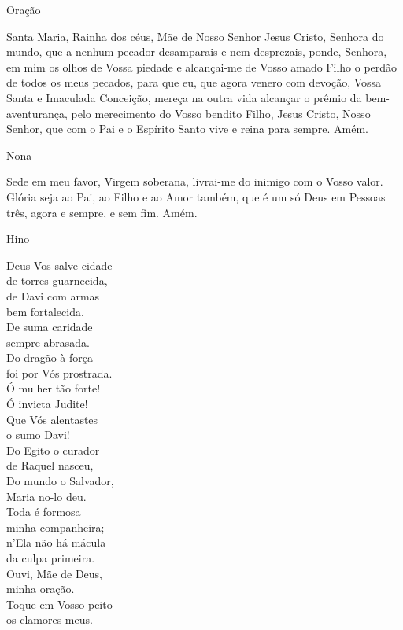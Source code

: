 \begin{center}
    \textcolor{VioletRed3}{Oração}
\end{center}
\begin{flushleft}
    Santa Maria, Rainha dos céus, Mãe de Nosso Senhor Jesus Cristo, Senhora do mundo, que a nenhum pecador desamparais e nem desprezais, ponde, Senhora, em mim os olhos de Vossa piedade e alcançai-me de Vosso amado Filho o perdão de todos os meus pecados, para que eu, que agora venero com devoção, Vossa Santa e Imaculada Conceição, mereça na outra vida alcançar o prêmio da bem-aventurança, pelo merecimento do Vosso bendito Filho, Jesus Cristo, Nosso Senhor, que com o Pai e o Espírito Santo vive e reina para sempre. Amém.
\end{flushleft}
\newpage
\begin{center}
    Nona
\end{center}
\begin{flushleft}
    Sede em meu favor, Virgem soberana, livrai-me do inimigo com o Vosso valor. Glória seja ao Pai, ao Filho e ao Amor também, que é um só Deus em Pessoas três, agora e sempre, e sem fim. Amém.
\end{flushleft}
\begin{center}
    \textcolor{VioletRed3}{Hino}
\end{center}
\begin{multicols}{2}\setlength{\parindent}{0pt}
    Deus Vos salve cidade \\
    de torres guarnecida, \\
    de Davi com armas \\
    bem fortalecida.
    \vspace{.2cm} \\
    De suma caridade \\
    sempre abrasada. \\
    Do dragão à força \\
    foi por Vós prostrada.
    \vspace{.2cm} \\
    Ó mulher tão forte! \\
    Ó invicta Judite! \\
    Que Vós alentastes \\
    o sumo Davi!
    \vspace{.2cm} \\
    Do Egito o curador \\
    de Raquel nasceu, \\
    Do mundo o Salvador, \\
    Maria no-lo deu.
    \vspace{.2cm} \\
    Toda é formosa \\
    minha companheira; \\
    n'Ela não há mácula \\
    da culpa primeira.
    \vspace{.2cm} \\
    Ouvi, Mãe de Deus, \\
    minha oração. \\
    Toque em Vosso peito \\
    os clamores meus.
\end{multicols}
